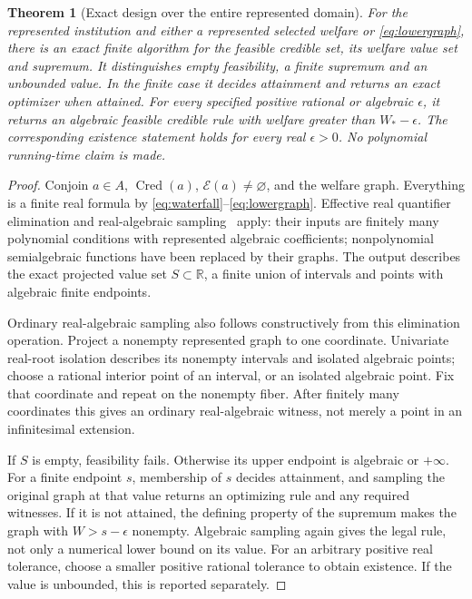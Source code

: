 \documentclass[11pt,a4paper]{article}
\numberwithin{equation}{section}
\newtheorem{theorem}{Theorem}[section]
\theoremstyle{definition}
\newcommand{\R}{\mathbb R}
\newcommand{\Cred}{\operatorname{Cred}}
\begin{document}
\begin{theorem}[Exact design over the entire represented domain]\label{thm:design}
For the represented institution and either a represented selected welfare
or \eqref{eq:lowergraph}, there is an exact finite algorithm for the
feasible credible set, its welfare value set and supremum. It distinguishes
empty feasibility, a finite supremum and an unbounded value. In the finite
case it decides attainment and returns an exact optimizer when attained.
For every specified positive rational or algebraic \(\epsilon\), it returns
an algebraic feasible credible rule with welfare greater than
\(W_*-\epsilon\). The corresponding existence statement holds for every
real \(\epsilon>0\). No polynomial running-time claim is made.
\end{theorem}
\begin{proof}
Conjoin \(a\in A\), \(\Cred(a)\), \(\mathcal E(a)\ne\varnothing\), and the
welfare graph. Everything is a finite real formula by
\eqref{eq:waterfall}--\eqref{eq:lowergraph}. Effective real quantifier
elimination and real-algebraic sampling~\cite{bpr,basu} apply: their
inputs are finitely many polynomial conditions with represented algebraic
coefficients; nonpolynomial semialgebraic functions have been replaced
by their graphs. The output describes the exact projected value set
\(S\subset\R\), a finite union of intervals and points with algebraic
finite endpoints.

Ordinary real-algebraic sampling also follows constructively from this
elimination operation. Project a nonempty represented graph to one
coordinate. Univariate real-root isolation describes its nonempty intervals
and isolated algebraic points; choose a rational interior point of an
interval, or an isolated algebraic point. Fix that coordinate and repeat
on the nonempty fiber. After finitely many coordinates this gives an
ordinary real-algebraic witness, not merely a point in an infinitesimal
extension.

If \(S\) is empty, feasibility fails. Otherwise its upper endpoint is
algebraic or \(+\infty\). For a finite endpoint \(s\), membership of \(s\)
decides attainment, and sampling the original graph at that value returns
an optimizing rule and any required witnesses. If it is not attained,
the defining property of the supremum makes the graph with
\(W>s-\epsilon\) nonempty. Algebraic sampling again gives the legal rule,
not only a numerical lower bound on its value. For an arbitrary positive
real tolerance, choose a smaller positive rational tolerance to obtain
existence. If the value is unbounded, this is reported separately.
\end{proof}
\end{document}
